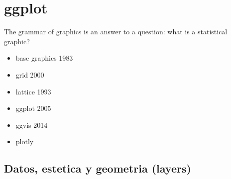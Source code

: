 \documentclass[
]{book}
\providecommand{\tightlist}{%
  \setlength{\itemsep}{0pt}\setlength{\parskip}{0pt}}
\begin{document}
\hypertarget{ggplot}{%
\section{ggplot}\label{ggplot}}

The grammar of graphics is an answer to a question: what is a statistical graphic?

\begin{itemize}
\tightlist
\item
  base graphics 1983
\item
  grid 2000
\item
  lattice 1993
\item
  ggplot 2005
\item
  ggvis 2014
\item
  plotly
\end{itemize}

\hypertarget{datos-estetica-y-geometria-layers}{%
\subsection{Datos, estetica y geometria (layers)}\label{datos-estetica-y-geometria-layers}}
\end{document}
